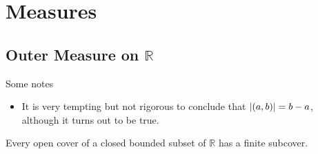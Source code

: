 \chapter{Measures}

\section{Outer Measure on $\mathbb{R}$}

Some notes
\begin{itemize}
    \item It is very tempting but not rigorous to conclude that $\left\vert{\left({a, b}\right)}\right\vert = b - a$, although it turns out to be true.
\end{itemize}

\begin{theorem}
    Every open cover of a closed bounded subset of $\mathbb{R}$ has a finite subcover.
\end{theorem}

